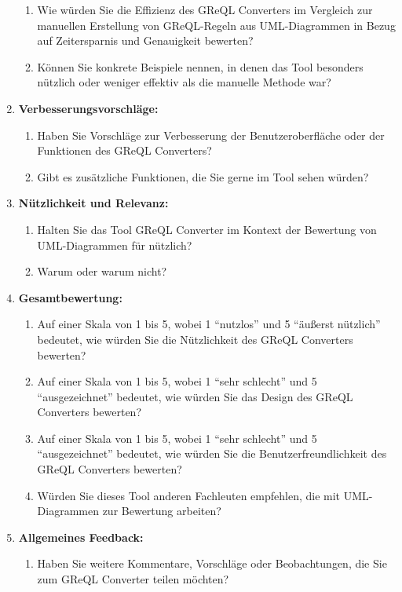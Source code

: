 \begin{enumerate}
    \begin{enumerate}
        \item Wie würden Sie die Effizienz des GReQL Converters im Vergleich zur manuellen Erstellung von GReQL-Regeln
        aus UML-Diagrammen in Bezug auf Zeitersparnis und Genauigkeit bewerten?
        \item Können Sie konkrete Beispiele nennen, in denen das Tool besonders nützlich oder weniger effektiv als
        die manuelle Methode war?
    \end{enumerate}
    \item \textbf{Verbesserungsvorschläge:}
    \begin{enumerate}
        \item Haben Sie Vorschläge zur Verbesserung der Benutzeroberfläche oder der Funktionen des GReQL Converters?
        \item Gibt es zusätzliche Funktionen, die Sie gerne im Tool sehen würden?
    \end{enumerate}
    \item \textbf{Nützlichkeit und Relevanz:}
    \begin{enumerate}
        \item Halten Sie das Tool GReQL Converter im Kontext der Bewertung von UML-Diagrammen für nützlich?
        \item Warum oder warum nicht?
    \end{enumerate}
    \item \textbf{Gesamtbewertung:}
    \begin{enumerate}
        \item Auf einer Skala von 1 bis 5, wobei 1 ``nutzlos'' und 5 ``äußerst nützlich'' bedeutet, wie würden Sie die
        Nützlichkeit des GReQL Converters bewerten?
        \item Auf einer Skala von 1 bis 5, wobei 1 ``sehr schlecht'' und 5 ``ausgezeichnet'' bedeutet, wie würden Sie
        das Design des GReQL Converters bewerten?
        \item Auf einer Skala von 1 bis 5, wobei 1 ``sehr schlecht'' und 5 ``ausgezeichnet'' bedeutet, wie würden Sie
        die Benutzerfreundlichkeit des GReQL Converters bewerten?
        \item Würden Sie dieses Tool anderen Fachleuten empfehlen, die mit UML-Diagrammen zur Bewertung arbeiten?
    \end{enumerate}
    \item \textbf{Allgemeines Feedback:}
    \begin{enumerate}
        \item Haben Sie weitere Kommentare, Vorschläge oder Beobachtungen, die Sie zum GReQL Converter teilen möchten?
    \end{enumerate}
\end{enumerate}

